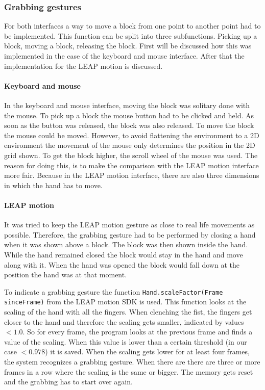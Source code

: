 \subsubsection{Grabbing gestures}
For both interfaces a way to move a block from one point to another point had to be implemented. This function can be split into three subfunctions. Picking up a block, moving a block, releasing the block. First will be discussed how this was implemented in the case of the keyboard and mouse interface. After that the implementation for the LEAP motion is discussed.

\paragraph{Keyboard and mouse}
In the keyboard and mouse interface, moving the block was solitary done with the mouse. To pick up a block the mouse button had to be clicked and held. As soon as the button was  released, the block was also released. To move the block the mouse could be moved. However, to avoid flattening the environment to a 2D environment the movement of the mouse only determines the position in the 2D grid shown. To get the block higher, the scroll wheel of the mouse was used. The reason for doing this, is to make the comparison with the LEAP motion interface more fair. Because in the LEAP motion interface, there are also three dimensions in which the hand has to move.

\paragraph{LEAP motion}
It was tried to keep the LEAP motion gesture as close to real life movements as possible. Therefore, the grabbing gesture had to be performed by closing a hand when it was shown above a block. The block was then shown inside the hand. While the hand remained closed the block would stay in the hand and move along with it. When the hand was opened the block would fall down at the position the hand was at that moment.

To indicate a grabbing gesture the function \texttt{Hand.scaleFactor(Frame sinceFrame)} from the LEAP motion SDK is used. This function looks at the scaling of the hand with all the fingers. When clenching the fist, the fingers get closer to the hand and therefore the scaling gets smaller, indicated by values $<1.0$. So for every frame, the program looks at the previous frame and finds a value of the scaling. When this value is lower than a certain threshold (in our case $<0.978$) it is saved. When the scaling gets lower for at least four frames, the system recognizes a grabbing gesture. When there are there are three or more frames in a row where the scaling is the same or bigger. The memory gets reset and the grabbing has to start over again.

